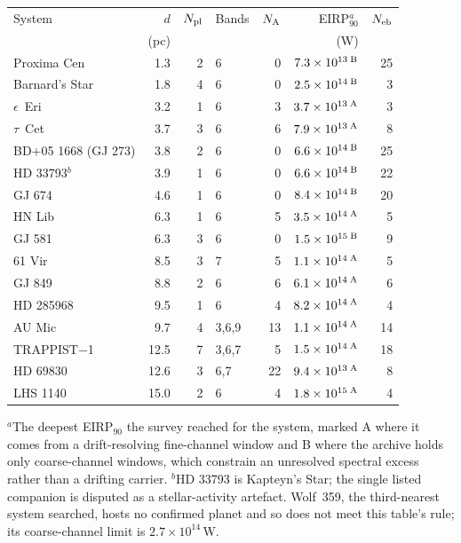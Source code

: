 \begin{tabular}{@{}l@{~~}r@{~~}r@{~~}l@{~~}r@{~~}r@{~~}r@{}}
\hline
System & $d$ & $N_{\rm pl}$ & Bands & $N_{\rm A}$ & EIRP$_{90}^{a}$ & $N_{\rm eb}$ \\
 & (pc) & & & & (W) & \\
\hline
Proxima Cen & 1.3 & 2 & 6 & 0 & $7.3\times10^{13}\,^{\rm B}$ & 25 \\
Barnard's Star & 1.8 & 4 & 6 & 0 & $2.5\times10^{14}\,^{\rm B}$ & 3 \\
$\epsilon$~Eri & 3.2 & 1 & 6 & 3 & $3.7\times10^{13}\,^{\rm A}$ & 3 \\
$\tau$~Cet & 3.7 & 3 & 6 & 6 & $7.9\times10^{13}\,^{\rm A}$ & 8 \\
BD+05 1668 (GJ 273) & 3.8 & 2 & 6 & 0 & $6.6\times10^{14}\,^{\rm B}$ & 25 \\
HD 33793$^{b}$ & 3.9 & 1 & 6 & 0 & $6.6\times10^{14}\,^{\rm B}$ & 22 \\
GJ 674 & 4.6 & 1 & 6 & 0 & $8.4\times10^{14}\,^{\rm B}$ & 20 \\
HN Lib & 6.3 & 1 & 6 & 5 & $3.5\times10^{14}\,^{\rm A}$ & 5 \\
GJ 581 & 6.3 & 3 & 6 & 0 & $1.5\times10^{15}\,^{\rm B}$ & 9 \\
61 Vir & 8.5 & 3 & 7 & 5 & $1.1\times10^{14}\,^{\rm A}$ & 5 \\
GJ 849 & 8.8 & 2 & 6 & 6 & $6.1\times10^{14}\,^{\rm A}$ & 6 \\
HD 285968 & 9.5 & 1 & 6 & 4 & $8.2\times10^{14}\,^{\rm A}$ & 4 \\
AU Mic & 9.7 & 4 & 3,6,9 & 13 & $1.1\times10^{14}\,^{\rm A}$ & 14 \\
TRAPPIST$-$1 & 12.5 & 7 & 3,6,7 & 5 & $1.5\times10^{14}\,^{\rm A}$ & 18 \\
HD 69830 & 12.6 & 3 & 6,7 & 22 & $9.4\times10^{13}\,^{\rm A}$ & 8 \\
LHS 1140 & 15.0 & 2 & 6 & 4 & $1.8\times10^{15}\,^{\rm A}$ & 4 \\
\hline
\end{tabular}

{\footnotesize $^{a}$The deepest EIRP$_{90}$ the survey reached for the system, marked A where it comes from a drift-resolving fine-channel window and B where the archive holds only coarse-channel windows, which constrain an unresolved spectral excess rather than a drifting carrier. $^{b}$HD 33793 is Kapteyn's Star; the single listed companion is disputed as a stellar-activity artefact. Wolf~359, the third-nearest system searched, hosts no confirmed planet and so does not meet this table's rule; its coarse-channel limit is $2.7\times10^{14}$\,W.}
